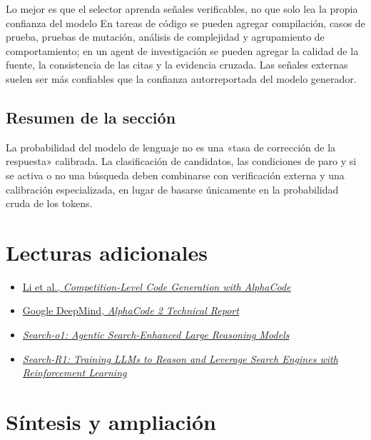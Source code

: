\documentclass[a4paper]{article}
\begin{document}
\begin{knowledgebox}{Lo mejor es que el selector aprenda señales verificables, no que solo lea la propia confianza del modelo}
En tareas de código se pueden agregar compilación, casos de prueba, pruebas de mutación, análisis de complejidad y agrupamiento de comportamiento; en un agent de investigación se pueden agregar la calidad de la fuente, la consistencia de las citas y la evidencia cruzada. Las señales externas suelen ser más confiables que la confianza autorreportada del modelo generador.
\end{knowledgebox}

\subsection{Resumen de la sección}

La probabilidad del modelo de lenguaje no es una «tasa de corrección de la respuesta» calibrada. La clasificación de candidatos, las condiciones de paro y si se activa o no una búsqueda deben combinarse con verificación externa y una calibración especializada, en lugar de basarse únicamente en la probabilidad cruda de los tokens.

\section{Lecturas adicionales}

\begin{itemize}
    \item \href{https://arxiv.org/abs/2203.07814}{Li et al., \emph{Competition-Level Code Generation with AlphaCode}}
    \item \href{https://storage.googleapis.com/deepmind-media/AlphaCode2/AlphaCode2_Tech_Report.pdf}{Google DeepMind, \emph{AlphaCode 2 Technical Report}}
    \item \href{https://arxiv.org/search/?query=Search-o1%3A+Agentic+Search-Enhanced+Large+Reasoning+Models\&searchtype=all}{\emph{Search-o1: Agentic Search-Enhanced Large Reasoning Models}}
    \item \href{https://arxiv.org/search/?query=Search-R1\&searchtype=all}{\emph{Search-R1: Training LLMs to Reason and Leverage Search Engines with Reinforcement Learning}}
\end{itemize}

\section{Síntesis y ampliación}
\end{document}
